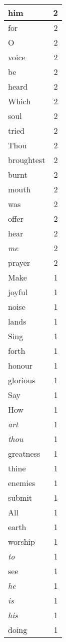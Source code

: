 \begin{center}
\begin{longtable}{l|r}
him & 2 \\ \hline
for & 2 \\ \hline
O & 2 \\ \hline
voice & 2 \\ \hline
be & 2 \\ \hline
heard & 2 \\ \hline
Which & 2 \\ \hline
soul & 2 \\ \hline
tried & 2 \\ \hline
Thou & 2 \\ \hline
broughtest & 2 \\ \hline
burnt & 2 \\ \hline
mouth & 2 \\ \hline
was & 2 \\ \hline
offer & 2 \\ \hline
hear & 2 \\ \hline
\emph{me} & 2 \\ \hline
prayer & 2 \\ \hline
Make & 1 \\ \hline
joyful & 1 \\ \hline
noise & 1 \\ \hline
lands & 1 \\ \hline
Sing & 1 \\ \hline
forth & 1 \\ \hline
honour & 1 \\ \hline
glorious & 1 \\ \hline
Say & 1 \\ \hline
How & 1 \\ \hline
\emph{art} & 1 \\ \hline
\emph{thou} & 1 \\ \hline
greatness & 1 \\ \hline
thine & 1 \\ \hline
enemies & 1 \\ \hline
submit & 1 \\ \hline
All & 1 \\ \hline
earth & 1 \\ \hline
worship & 1 \\ \hline
\emph{to} & 1 \\ \hline
see & 1 \\ \hline
\emph{he} & 1 \\ \hline
\emph{is} & 1 \\ \hline
\emph{his} & 1 \\ \hline
doing & 1 \\ \hline

\end{longtable}
\end{center}

